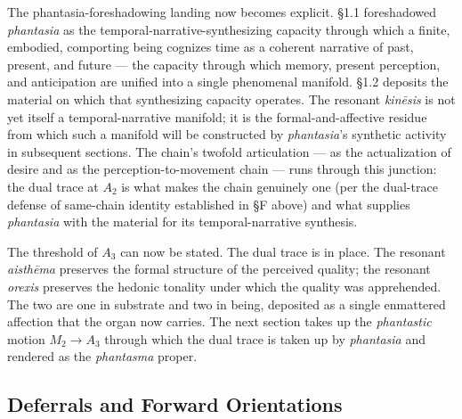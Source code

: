 The phantasia-foreshadowing landing now becomes explicit. §1.1 foreshadowed \textit{phantasia} as the temporal-narrative-synthesizing capacity through which a finite, embodied, comporting being cognizes time as a coherent narrative of past, present, and future --- the capacity through which memory, present perception, and anticipation are unified into a single phenomenal manifold. §1.2 deposits the material on which that synthesizing capacity operates. The resonant \textit{kinēsis} is not yet itself a temporal-narrative manifold; it is the formal-and-affective residue from which such a manifold will be constructed by \textit{phantasia}'s synthetic activity in subsequent sections. The chain's twofold articulation --- as the actualization of desire and as the perception-to-movement chain --- runs through this junction: the dual trace at $A_2$ is what makes the chain genuinely one (per the dual-trace defense of same-chain identity established in §F above) and what supplies \textit{phantasia} with the material for its temporal-narrative synthesis.

The threshold of $A_3$ can now be stated. The dual trace is in place. The resonant \textit{aisthēma} preserves the formal structure of the perceived quality; the resonant \textit{orexis} preserves the hedonic tonality under which the quality was apprehended. The two are one in substrate and two in being, deposited as a single enmattered affection that the organ now carries. The next section takes up the \textit{phantastic} motion $M_2 \rightarrow A_3$ through which the dual trace is taken up by \textit{phantasia} and rendered as the \textit{phantasma} proper.

\subsection*{Deferrals and Forward Orientations}

